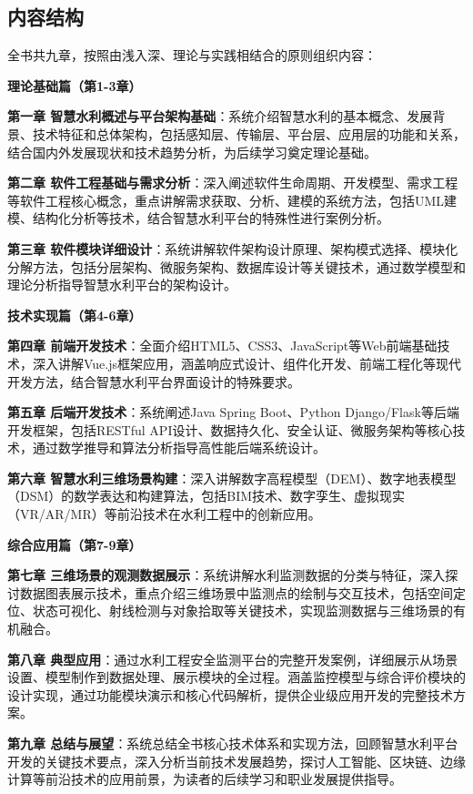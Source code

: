 \documentclass[12pt,a4paper]{ctexart}
\begin{document}
\subsection{内容结构}\label{ux5185ux5bb9ux7ed3ux6784}

全书共九章，按照由浅入深、理论与实践相结合的原则组织内容：

\begin{tcolorbox}[colback=blue!5!white,colframe=blue!75!black,title=章节概览]
\textbf{理论基础篇（第1-3章）}

    \textbf{第一章 智慧水利概述与平台架构基础}：系统介绍智慧水利的基本概念、发展背景、技术特征和总体架构，包括感知层、传输层、平台层、应用层的功能和关系，结合国内外发展现状和技术趋势分析，为后续学习奠定理论基础。
    
    \textbf{第二章 软件工程基础与需求分析}：深入阐述软件生命周期、开发模型、需求工程等软件工程核心概念，重点讲解需求获取、分析、建模的系统方法，包括UML建模、结构化分析等技术，结合智慧水利平台的特殊性进行案例分析。
    
    \textbf{第三章 软件模块详细设计}：系统讲解软件架构设计原理、架构模式选择、模块化分解方法，包括分层架构、微服务架构、数据库设计等关键技术，通过数学模型和理论分析指导智慧水利平台的架构设计。

\textbf{技术实现篇（第4-6章）}

    \textbf{第四章 前端开发技术}：全面介绍HTML5、CSS3、JavaScript等Web前端基础技术，深入讲解Vue.js框架应用，涵盖响应式设计、组件化开发、前端工程化等现代开发方法，结合智慧水利平台界面设计的特殊要求。
    
    \textbf{第五章 后端开发技术}：系统阐述Java Spring Boot、Python Django/Flask等后端开发框架，包括RESTful API设计、数据持久化、安全认证、微服务架构等核心技术，通过数学推导和算法分析指导高性能后端系统设计。
    
    \textbf{第六章 智慧水利三维场景构建}：深入讲解数字高程模型（DEM）、数字地表模型（DSM）的数学表达和构建算法，包括BIM技术、数字孪生、虚拟现实（VR/AR/MR）等前沿技术在水利工程中的创新应用。

\textbf{综合应用篇（第7-9章）}

    \textbf{第七章 三维场景的观测数据展示}：系统讲解水利监测数据的分类与特征，深入探讨数据图表展示技术，重点介绍三维场景中监测点的绘制与交互技术，包括空间定位、状态可视化、射线检测与对象拾取等关键技术，实现监测数据与三维场景的有机融合。
    
    \textbf{第八章 典型应用}：通过水利工程安全监测平台的完整开发案例，详细展示从场景设置、模型制作到数据处理、展示模块的全过程。涵盖监控模型与综合评价模块的设计实现，通过功能模块演示和核心代码解析，提供企业级应用开发的完整技术方案。
    
    \textbf{第九章 总结与展望}：系统总结全书核心技术体系和实现方法，回顾智慧水利平台开发的关键技术要点，深入分析当前技术发展趋势，探讨人工智能、区块链、边缘计算等前沿技术的应用前景，为读者的后续学习和职业发展提供指导。
\end{tcolorbox}
\end{document}
